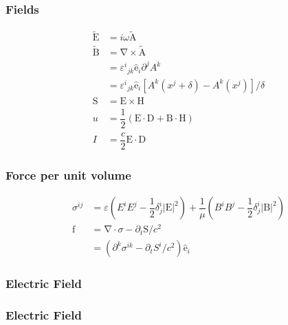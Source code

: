 \documentclass[xcolor=dvipsnames]{beamer}
\renewcommand{\c}{\cdot} %
\newcommand{\f}[2]{\dfrac{#1}{#2}} %
\newcommand{\p}[1]{\left(#1\right)} %
\renewcommand{\sp}[1]{\left[#1\right]} %
\newcommand{\abs}[1]{\left|#1\right|} %
\renewcommand{\epsilon}{\varepsilon} %
\renewcommand{\v}[1]{\boldsymbol{\mathrm{#1}}} %
\newcommand{\uv}[1]{\hat{\boldsymbol{\mathrm{#1}}}} %
\newcommand{\del}{\v\nabla} %
\renewcommand{\d}{\partial} %
\newcommand{\cxv}[1]{\v{\widetilde{#1}}} %
\begin{document}
\begin{frame}
  \frametitle{Fields}
  \begin{align*}
    \cxv E&=i\omega\cxv A \\
    \cxv B&=\del \times\cxv A \\
    &={\varepsilon^i}_{jk}\uv e_i\d^jA^k \\
    &={\varepsilon^i}_{jk}\uv
    e_i\sp{A^k\p{x^j+\delta}-A^k\p{x^j}}/\delta \\
    \v S&=\v E\times\v H \\
    u&=\f12\p{\v E\c\v D+\v B\c\v H} \\
    I&=\f c2\v E\c\v D
  \end{align*}
\end{frame}

\begin{frame}
  \frametitle{Force per unit volume}
  \begin{align*}
    \sigma^{ij}&=\epsilon\p{E^iE^j-\f12\delta^i_j\abs{\v E}^2}
    +\f1\mu\p{B^iB^j-\f12\delta^i_j\abs{\v B}^2} \\
    \v f&=\del\c\sigma-\d_t\v S/c^2 \\
    &=\p{\d^k\sigma^{ik}-\d_tS^i/c^2}\uv e_i
  \end{align*}
\end{frame}

\begin{frame}
  \frametitle{Electric Field}
  \begin{figure}[h]
    \centering
    \vspace{-.41in}
  \end{figure}
\end{frame}

\begin{frame}
  \frametitle{Electric Field}
  \begin{columns}[T,totalwidth=\textwidth]
    \vspace{-.1in}
    \begin{figure}[h]
      \centering
    \end{figure}


    \begin{figure}[h]
      \centering
    \end{figure}


  \end{columns}
\end{frame}
\end{document}
